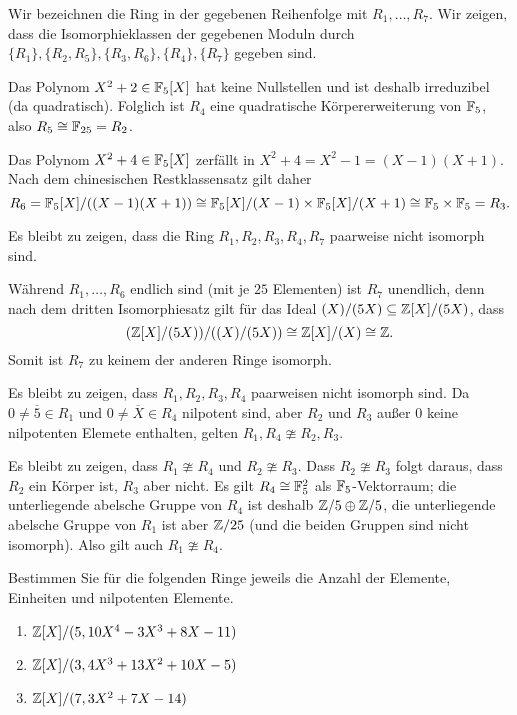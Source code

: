 \begin{solution}
  Wir bezeichnen die Ring in der gegebenen Reihenfolge mit $R_1, \dotsc, R_7$.
  Wir zeigen, dass die Isomorphieklassen der gegebenen Moduln durch $\{R_1\}, \{R_2, R_5\}, \{R_3, R_6\}, \{R_4\}, \{R_7\}$ gegeben sind.
  
  Das Polynom $X^2 + 2 \in \mathbb{F}_5[X]$ hat keine Nullstellen und ist deshalb irreduzibel (da quadratisch).
  Folglich ist $R_4$ eine quadratische Körpererweiterung von $\mathbb{F}_5$, also $R_5 \cong \mathbb{F}_{25} = R_2$.
  
  Das Polynom $X^2 + 4 \in \mathbb{F}_5[X]$ zerfällt in $X^2 + 4 = X^2 - 1 = (X-1)(X+1)$.
  Nach dem chinesischen Restklassensatz gilt daher
  \[
          R_6
    =     \mathbb{F}_5[X]/((X-1)(X+1))
    \cong \mathbb{F}_5[X]/(X-1) \times \mathbb{F}_5[X]/(X+1)
    \cong \mathbb{F}_5 \times \mathbb{F}_5
    =     R_3.
  \]
  
  Es bleibt zu zeigen, dass die Ring $R_1, R_2, R_3, R_4, R_7$ paarweise nicht isomorph sind.
  
  Während $R_1, \dotsc, R_6$ endlich sind (mit je $25$ Elementen) ist $R_7$ unendlich, denn nach dem dritten Isomorphiesatz gilt für das Ideal $(X)/(5X) \subseteq \mathbb{Z}[X]/(5X)$, dass
  \[
           (\mathbb{Z}[X]/(5X))/((X)/(5X))
    \cong \mathbb{Z}[X]/(X)
    \cong \mathbb{Z}.
  \]
  Somit ist $R_7$ zu keinem der anderen Ringe isomorph.
  
  Es bleibt zu zeigen, dass $R_1, R_2, R_3, R_4$ paarweisen nicht isomorph sind.
  Da $0 \neq \overline{5} \in R_1$ und $0 \neq \overline{X} \in R_4$ nilpotent sind, aber $R_2$ und $R_3$ außer $0$ keine nilpotenten Elemete enthalten, gelten $R_1, R_4 \ncong R_2, R_3$.
  
  Es bleibt zu zeigen, dass $R_1 \ncong R_4$ und $R_2 \ncong R_3$.
  Dass $R_2 \ncong R_3$ folgt daraus, dass $R_2$ ein Körper ist, $R_3$ aber nicht.
  Es gilt $R_4 \cong \mathbb{F}_5^2$ als $\mathbb{F}_5$-Vektorraum;
  die unterliegende abelsche Gruppe von $R_4$ ist deshalb $\mathbb{Z}/5 \oplus \mathbb{Z}/5$, die unterliegende abelsche Gruppe von $R_1$ ist aber $\mathbb{Z}/25$ (und die beiden Gruppen sind nicht isomorph).
  Also gilt auch $R_1 \ncong R_4$.
\end{solution}


\begin{question}[subtitle = Vereinfachung von Quotienten]
  Bestimmen Sie für die folgenden Ringe jeweils die Anzahl der Elemente, Einheiten und nilpotenten Elemente.
  \begin{enumerate}
    \item
      $\mathbb{Z}[X]/(5, 10 X^4 - 3 X^3 + 8 X - 11)$
    \item
      $\mathbb{Z}[X]/(3, 4 X^3 + 13 X^2 + 10 X - 5)$
    \item
      $\mathbb{Z}[X]/(7, 3 X^2 + 7X - 14)$
  \end{enumerate}
\end{question}


